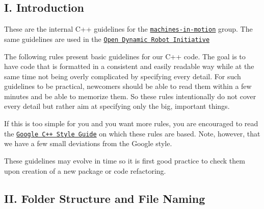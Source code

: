 \subsection*{I. Introduction}

These are the internal C++ guidelines for the \href{https://wp.nyu.edu/machinesinmotion/}{\tt machines-\/in-\/motion} group. The same guidelines are used in the \href{https://open-dynamic-robot-initiative.github.io/}{\tt Open Dynamic Robot Initiative}

The following rules present basic guidelines for our C++ code. The goal is to have code that is formatted in a consistent and easily readable way while at the same time not being overly complicated by specifying every detail. For such guidelines to be practical, newcomers should be able to read them within a few minutes and be able to memorize them. So these rules intentionally do not cover every detail but rather aim at specifying only the big, important things.

If this is too simple for you and you want more rules, you are encouraged to read the \href{https://google.github.io/styleguide/cppguide.html}{\tt Google C++ Style Guide} on which these rules are based. Note, however, that we have a few small deviations from the Google style.

These guidelines may evolve in time so it is first good practice to check them upon creation of a new package or code refactoring.

\subsection*{II. Folder Structure and File Naming}


